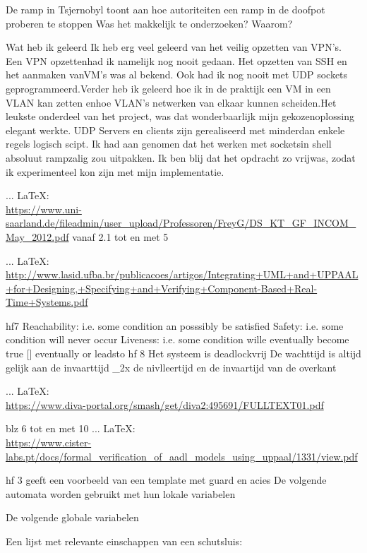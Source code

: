 \begin{thebibliography}{99}
{{De ramp in Tsjernobyl toont aan hoe autoriteiten een ramp in de doofpot proberen te stoppen
Was het makkelijk te onderzoeken? Waarom?



Wat heb ik geleerd
Ik heb erg veel geleerd van het veilig opzetten van VPN’s. Een VPN opzettenhad ik namelijk nog nooit gedaan. Het opzetten van SSH en het aanmaken vanVM’s was al bekend. Ook had ik nog nooit met UDP sockets geprogrammeerd.Verder heb ik geleerd hoe ik in de praktijk een VM in een VLAN kan zetten enhoe VLAN’s netwerken van elkaar kunnen scheiden.Het leukste onderdeel van het project, was dat wonderbaarlijk mijn gekozenoplossing elegant werkte. UDP Servers en clients zijn gerealiseerd met minderdan enkele regels logisch scipt. Ik had aan genomen dat het werken met socketsin shell absoluut rampzalig zou uitpakken. Ik ben blij dat het opdracht zo vrijwas, zodat ik experimenteel kon zijn met mijn implementatie.




 ... \LaTeX:\\ \url{https://www.uni-saarland.de/fileadmin/user_upload/Professoren/FreyG/DS_KT_GF_INCOM_May_2012.pdf}
vanaf 2.1 tot en met 5

 ... \LaTeX:\\ \url{http://www.lasid.ufba.br/publicacoes/artigos/Integrating+UML+and+UPPAAL+for+Designing,+Specifying+and+Verifying+Component-Based+Real-Time+Systems.pdf}

hf7
Reachability: i.e. some condition an posssibly be satisfied
Safety: i.e. some condition will never occur
Liveness: i.e. some condition wille eventually become true [] eventually or leadsto
hf 8
Het systeem is deadlockvrij
De wachttijd is altijd gelijk aan de invaarttijd _2x de nivlleertijd en de invaartijd van de overkant

 ... \LaTeX:\\ \url{https://www.diva-portal.org/smash/get/diva2:495691/FULLTEXT01.pdf}

blz 6 tot en met 10
 ... \LaTeX:\\ \url{https://www.cister-labs.pt/docs/formal_verification_of_aadl_models_using_uppaal/1331/view.pdf}

hf 3 geeft een voorbeeld van een template met guard en acies
De volgende automata worden gebruikt met hun lokale variabelen

De volgende globale variabelen

Een lijst met relevante einschappen van een schutsluis:

}}
\end{thebibliography}
